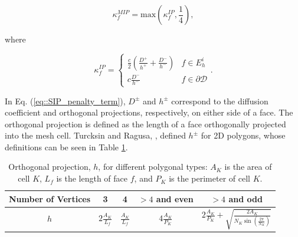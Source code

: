 \documentclass[preprint,10pt]{elsarticle}
\begin{document}
\begin{equation}
\label{eq::MIP_penalty_term}
\kappa_f^{MIP} = \text{max} \left( \kappa_f^{IP}, \frac{1}{4} \right) ,
\end{equation}

\noindent where

\begin{equation}
\label{eq::SIP_penalty_term}
\kappa_f^{IP} = 
\begin{cases}
	\frac{c}{2} \left(  \frac{D^+}{h^+} + \frac{D^-}{h^-} \right) & f \in E_h^i\\ 
	c \frac{D^-}{h^-}& f \in \partial \mathcal{D}
\end{cases}.
\end{equation}

\noindent In Eq. (\ref{eq::SIP_penalty_term}), $D^{\pm}$ and $h^{\pm}$ correspond to the diffusion coefficient and orthogonal projections, respectively, on either side of a face. The orthogonal projection is defined as the length of a face orthogonally projected into the mesh cell. Turcksin and Ragusa, \cite{turcksin2014discontinuous}, defined $h^\pm$ for 2D polygons, whose definitions can be seen in Table \ref{tab::orth_proj_2D}.

\begin{table}[h]
\centering
\caption{Orthogonal projection, $h$, for different polygonal types: $A_K$ is the area of cell $K$, $L_f$ is the length of face $f$, and $P_K$ is the perimeter of cell $K$.}
\def\arraystretch{1.4}
\begin{tabular}{|c|c|c|c|c|}
	\hline
	Number of Vertices & 3 & 4 & $>4$ and even& $>4$ and odd \\
	\hline
	$h$ & $2 \frac{A_K}{L_f}$ & $\frac{A_K}{L_f}$ & $4 \frac{A_K}{P_K}$ & $2 \frac{A_K}{P_K} + \sqrt{\frac{2 A_K}{N_K \sin(\frac{2 \pi}{N_K})}}$ \\
	\hline
\end{tabular}
\label{tab::orth_proj_2D}
\end{table}
\end{document}
